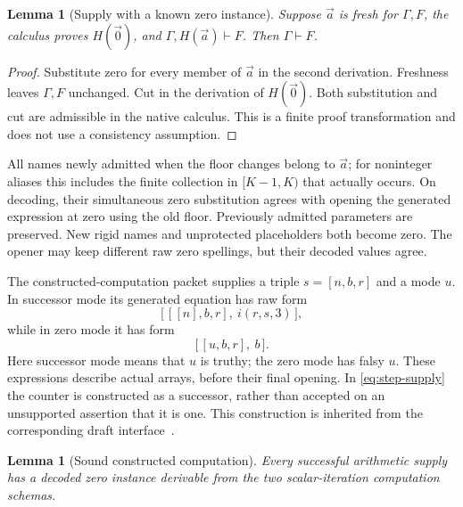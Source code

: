 \documentclass[11pt,letterpaper]{article}
\newtheorem{lemma}[theorem]{Lemma}
\theoremstyle{definition}
\theoremstyle{remark}
\begin{document}
\begin{lemma}[Supply with a known zero instance]
\label{lem:zero-supply}
Suppose $\vec a$ is fresh for $\Gamma,F$, the calculus proves
$H(\vec0)$, and $\Gamma,H(\vec a)\vdash F$.  Then
$\Gamma\vdash F$.
\end{lemma}

\begin{proof}
Substitute zero for every member of $\vec a$ in the second derivation.
Freshness leaves $\Gamma,F$ unchanged.  Cut in the derivation of
$H(\vec0)$.  Both substitution and cut are admissible in the native
calculus.  This is a finite proof transformation and does not use a
consistency assumption.
\end{proof}

All names newly admitted when the floor changes belong to $\vec a$;
for noninteger aliases this includes the finite collection in
$[K-1,K)$ that actually occurs.  On decoding, their simultaneous zero
substitution agrees with opening the generated expression at zero using
the old floor.  Previously admitted parameters are preserved.  New
rigid names and unprotected placeholders both become zero.  The opener
may keep different raw zero spellings, but their decoded values agree.

The constructed-computation packet supplies a triple $s=[n,b,r]$ and a
mode $u$.  In successor mode its generated equation has raw form
\[
 \bigl[\,[[n],b,r],\ i(r,s,3)\,\bigr],
 \tag{Step supply}\label{eq:step-supply}
\]
while in zero mode it has form
\[
                    \bigl[\,[u,b,r],\ b\,\bigr].
 \tag{Zero supply}\label{eq:base-supply}
\]
Here successor mode means that $u$ is truthy; the zero mode has falsy
$u$.  These expressions describe actual arrays, before their final
opening.  In \eqref{eq:step-supply} the counter is constructed as a
successor, rather than accepted on an unsupported assertion that it is
one.  This construction is inherited from the corresponding draft
interface~\cite{constructed}.

\begin{lemma}[Sound constructed computation]
\label{lem:constructed-supply}
Every successful arithmetic supply has a decoded zero instance
derivable from the two scalar-iteration computation schemas.
\end{lemma}
\end{document}
